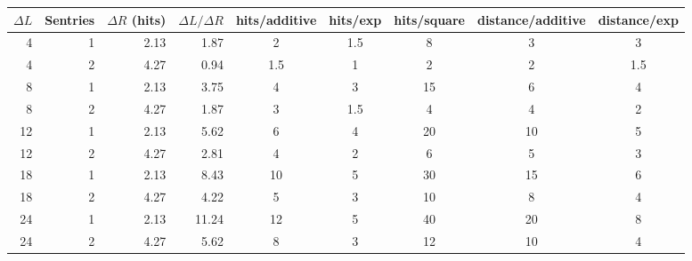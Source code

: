 \begin{tabular}{rrrr|ccccc}
\toprule
$\Delta L$ & Sentries & $\Delta R$ (hits) & $\Delta L/\Delta R$ & hits/additive & hits/exp & hits/square & distance/additive & distance/exp \\
\midrule
4 & 1 & 2.13 & 1.87 & 2 & 1.5 & 8 & 3 & 3 \\
4 & 2 & 4.27 & 0.94 & 1.5 & 1 & 2 & 2 & 1.5 \\
8 & 1 & 2.13 & 3.75 & 4 & 3 & 15 & 6 & 4 \\
8 & 2 & 4.27 & 1.87 & 3 & 1.5 & 4 & 4 & 2 \\
12 & 1 & 2.13 & 5.62 & 6 & 4 & 20 & 10 & 5 \\
12 & 2 & 4.27 & 2.81 & 4 & 2 & 6 & 5 & 3 \\
18 & 1 & 2.13 & 8.43 & 10 & 5 & 30 & 15 & 6 \\
18 & 2 & 4.27 & 4.22 & 5 & 3 & 10 & 8 & 4 \\
24 & 1 & 2.13 & 11.24 & 12 & 5 & 40 & 20 & 8 \\
24 & 2 & 4.27 & 5.62 & 8 & 3 & 12 & 10 & 4 \\
\bottomrule
\end{tabular}
